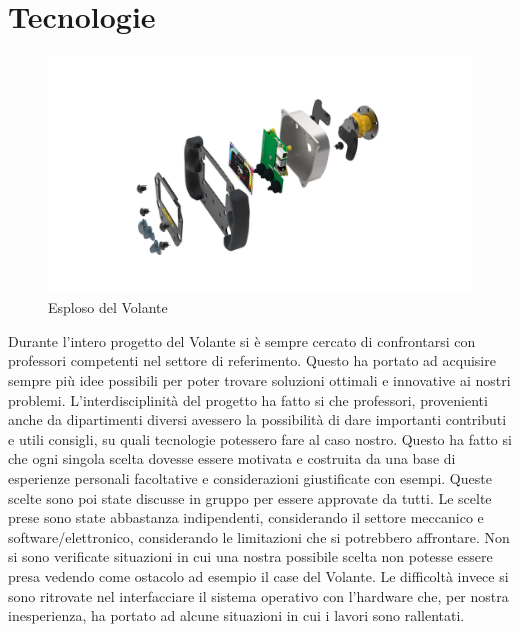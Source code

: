 \chapter{Tecnologie}

\begin{figure}[hbt!]
    \centering
    \includegraphics[width=1\textwidth]{./figures/steeringwheelEsploso.png}
    \caption{Esploso del Volante}
\end{figure}

Durante l'intero progetto del Volante si è sempre cercato di confrontarsi con professori competenti nel settore di referimento.
Questo ha portato ad acquisire sempre più idee possibili per poter trovare soluzioni ottimali e innovative ai nostri problemi.
L'interdisciplinità del progetto ha fatto si che professori, provenienti anche da dipartimenti diversi avessero la possibilità di dare importanti 
contributi e utili consigli, su quali tecnologie potessero fare al caso nostro.
Questo ha fatto si che ogni singola scelta dovesse essere motivata e costruita da una base di esperienze personali facoltative e considerazioni
giustificate con esempi. Queste scelte sono poi state discusse in gruppo per essere approvate da tutti.
Le scelte prese sono state abbastanza indipendenti, considerando il settore meccanico e software/elettronico, considerando le limitazioni che si potrebbero affrontare.
Non si sono verificate situazioni in cui una nostra possibile scelta non potesse essere presa vedendo come ostacolo ad esempio il case del Volante.
Le difficoltà invece si sono ritrovate nel interfacciare il sistema operativo con l'hardware che, per nostra inesperienza, ha portato ad alcune 
situazioni in cui i lavori sono rallentati.   


\newpage


